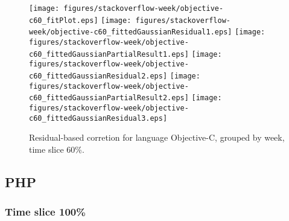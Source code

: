 \begin{figure}[t]
\centering
{}
{\texttt{[image: figures/stackoverflow-week/objective-c60\_fitPlot.eps]}}
{\texttt{[image: figures/stackoverflow-week/objective-c60\_fittedGaussianResidual1.eps]}}
{\texttt{[image: figures/stackoverflow-week/objective-c60\_fittedGaussianPartialResult1.eps]}}
{\texttt{[image: figures/stackoverflow-week/objective-c60\_fittedGaussianResidual2.eps]}}
{\texttt{[image: figures/stackoverflow-week/objective-c60\_fittedGaussianPartialResult2.eps]}}
{\texttt{[image: figures/stackoverflow-week/objective-c60\_fittedGaussianResidual3.eps]}}
\caption{Residual-based corretion for language Objective-C, grouped by week, time slice 60\%.}
\end{figure}


\FloatBarrier


\subsection{PHP}

\subsubsection{Time slice 100\%}

